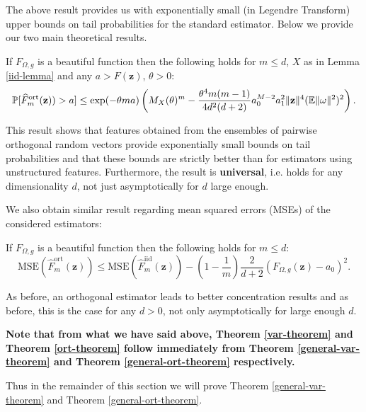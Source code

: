 The above result provides us with exponentially small (in Legendre Transform) upper bounds on tail probabilities for the standard estimator.
Below we provide our two main theoretical results. 

\begin{theorem}
\label{general-ort-theorem}
If $F_{\Omega, g}$ is a beautiful function then the following holds for $m \leq d$, $X$ as in Lemma \ref{iid-lemma} and any $a>F(\mathbf{z})$, $\theta > 0$: 
\begin{equation}
\mathbb{P}[\widehat{F}^{\mathrm{ort}}_{m}(\mathbf{z})) > a] \leq \exp(-\theta m a) \left( M_X (\theta)^m - \frac{\theta^4 m (m - 1)}{4 d^2 (d + 2)} a_0^{M - 2} a_1^2 \| \mathbf{z} \|^4 (\mathbb{E} \| \omega \|^2)^2 \right).
\end{equation}
\end{theorem}

This result shows that features obtained from the ensembles of pairwise orthogonal random vectors provide exponentially small bounds on tail probabilities and that these bounds are strictly better than for estimators using unstructured features. Furthermore, the result is \textbf{universal}, i.e. holds for any dimensionality $d$, not just asymptotically for $d$ large enough.

We also obtain similar result regarding mean squared errors (MSEs) of the considered estimators:

\begin{theorem}
\label{general-var-theorem}
If $F_{\Omega, g}$ is a beautiful function then the following holds for $m \leq d$: 
\begin{equation}
\mathrm{MSE}(\widehat{F}^{\mathrm{ort}}_{m}(\mathbf{z})) \leq 
\mathrm{MSE}(\widehat{F}^{\mathrm{iid}}_{m}(\mathbf{z})) - (1-\frac{1}{m})\frac{2}{d+2}\left(F_{\Omega,g}(\mathbf{z}) - a_0 \right)^2.
\end{equation}
\end{theorem}
As before, an orthogonal estimator leads to better concentration results and as before, this is the case for any $d>0$, not only asymptotically for large enough $d$.

\textbf{Note that from what we have said above, Theorem \ref{var-theorem} and Theorem \ref{ort-theorem} follow immediately from Theorem \ref{general-var-theorem} and Theorem \ref{general-ort-theorem} respectively.} 

Thus in the remainder of this section we will prove Theorem \ref{general-var-theorem} and Theorem \ref{general-ort-theorem}.

